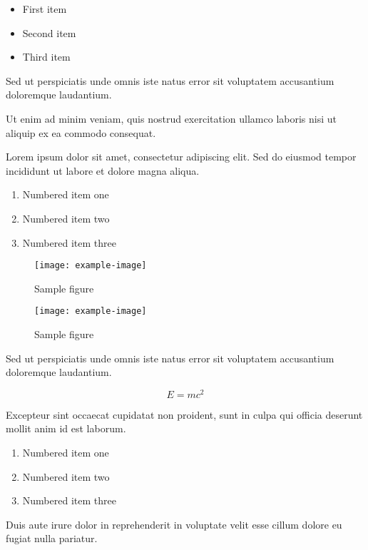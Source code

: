 \documentclass{article}
\begin{document}
\begin{itemize}
\item First item
\item Second item
\item Third item
\end{itemize}

Sed ut perspiciatis unde omnis iste natus error sit voluptatem accusantium doloremque laudantium.

Ut enim ad minim veniam, quis nostrud exercitation ullamco laboris nisi ut aliquip ex ea commodo consequat.

Lorem ipsum dolor sit amet, consectetur adipiscing elit. Sed do eiusmod tempor incididunt ut labore et dolore magna aliqua.


\begin{enumerate}
\item Numbered item one
\item Numbered item two
\item Numbered item three
\end{enumerate}


\begin{figure}[h]
    \centering
    \texttt{[image: example-image]}
    \caption{Sample figure}
    \label{fig:sample}
\end{figure}

\begin{figure}[h]
    \centering
    \texttt{[image: example-image]}
    \caption{Sample figure}
    \label{fig:sample}
\end{figure}

Sed ut perspiciatis unde omnis iste natus error sit voluptatem accusantium doloremque laudantium.

\begin{equation}
    E = mc^2
\end{equation}


Excepteur sint occaecat cupidatat non proident, sunt in culpa qui officia deserunt mollit anim id est laborum.


\begin{enumerate}
\item Numbered item one
\item Numbered item two
\item Numbered item three
\end{enumerate}

Duis aute irure dolor in reprehenderit in voluptate velit esse cillum dolore eu fugiat nulla pariatur.
\end{document}
